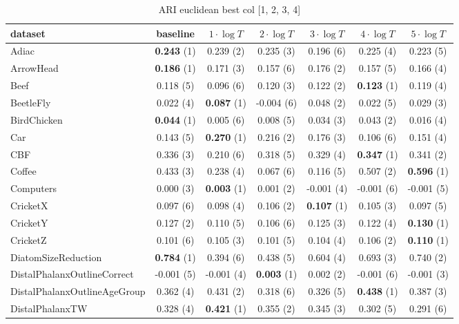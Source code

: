 \begin{table}[ht]
\caption{ARI euclidean best col [1, 2, 3, 4]} 
\begin{adjustbox}{width=\textwidth}
\begin{tabular}{lcccccc}
\hline
dataset & baseline & \textbf{$1\cdot \log{T}$} & \textbf{$2\cdot \log{T}$} & \textbf{$3\cdot \log{T}$} & \textbf{$4\cdot \log{T}$} & \textbf{$5\cdot \log{T}$} \\ \hline
Adiac & \textbf{0.243} (1) & 0.239 (2) & 0.235 (3) & 0.196 (6) & 0.225 (4) & 0.223 (5) \\
ArrowHead & \textbf{0.186} (1) & 0.171 (3) & 0.157 (6) & 0.176 (2) & 0.157 (5) & 0.166 (4) \\
Beef & 0.118 (5) & 0.096 (6) & 0.120 (3) & 0.122 (2) & \textbf{0.123} (1) & 0.119 (4) \\
BeetleFly & 0.022 (4) & \textbf{0.087} (1) & -0.004 (6) & 0.048 (2) & 0.022 (5) & 0.029 (3) \\
BirdChicken & \textbf{0.044} (1) & 0.005 (6) & 0.008 (5) & 0.034 (3) & 0.043 (2) & 0.016 (4) \\
Car & 0.143 (5) & \textbf{0.270} (1) & 0.216 (2) & 0.176 (3) & 0.106 (6) & 0.151 (4) \\
CBF & 0.336 (3) & 0.210 (6) & 0.318 (5) & 0.329 (4) & \textbf{0.347} (1) & 0.341 (2) \\
Coffee & 0.433 (3) & 0.238 (4) & 0.067 (6) & 0.116 (5) & 0.507 (2) & \textbf{0.596} (1) \\
Computers & 0.000 (3) & \textbf{0.003} (1) & 0.001 (2) & -0.001 (4) & -0.001 (6) & -0.001 (5) \\
CricketX & 0.097 (6) & 0.098 (4) & 0.106 (2) & \textbf{0.107} (1) & 0.105 (3) & 0.097 (5) \\
CricketY & 0.127 (2) & 0.110 (5) & 0.106 (6) & 0.125 (3) & 0.122 (4) & \textbf{0.130} (1) \\
CricketZ & 0.101 (6) & 0.105 (3) & 0.101 (5) & 0.104 (4) & 0.106 (2) & \textbf{0.110} (1) \\
DiatomSizeReduction & \textbf{0.784} (1) & 0.394 (6) & 0.438 (5) & 0.604 (4) & 0.693 (3) & 0.740 (2) \\
DistalPhalanxOutlineCorrect & -0.001 (5) & -0.001 (4) & \textbf{0.003} (1) & 0.002 (2) & -0.001 (6) & -0.001 (3) \\
DistalPhalanxOutlineAgeGroup & 0.362 (4) & 0.431 (2) & 0.318 (6) & 0.326 (5) & \textbf{0.438} (1) & 0.387 (3) \\
DistalPhalanxTW & 0.328 (4) & \textbf{0.421} (1) & 0.355 (2) & 0.345 (3) & 0.302 (5) & 0.291 (6) \\

\end{tabular}
\end{adjustbox}
\end{table}
